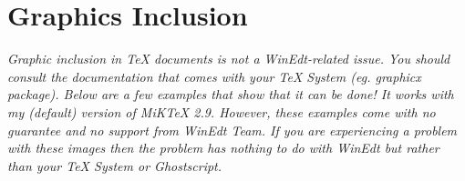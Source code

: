 \documentclass{article}
\begin{document}
\section{Graphics Inclusion}

\emph{Graphic inclusion in TeX documents is not a WinEdt-related issue. You
should consult the documentation that comes with your TeX System (eg.
graphicx package). Below are a few examples that show that it can be done! It
works with my (default) version of MiKTeX 2.9. However, these examples come
with no guarantee and no support from WinEdt Team. If you are experiencing a
problem with these images then the problem has nothing to do with WinEdt but
rather than your TeX System or Ghostscript.}
\end{document}
